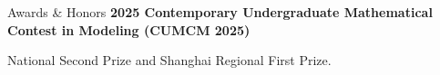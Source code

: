 \begin{rubric}{Awards \& Honors}
\entry*[2025]%
	\textbf{2025 Contemporary Undergraduate Mathematical Contest in Modeling (CUMCM 2025)}\par
	National Second Prize and Shanghai Regional First Prize.
\end{rubric}
